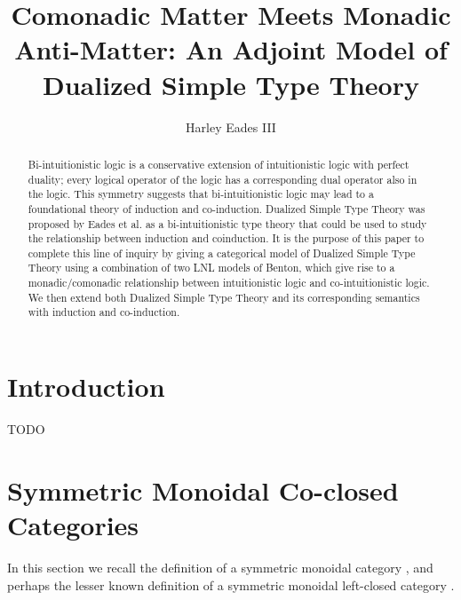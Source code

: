 \documentclass[letterpaper,USenglish]{lipics-v2016}
\date{}
\title{Comonadic Matter Meets Monadic Anti-Matter: An Adjoint Model of Dualized Simple Type Theory}
\author{Harley Eades III}
\affil{Computer and Information Sciences, Augusta University,
  Augusta, GA, \texttt{heades@augusta.edu}}
\begin{document}
\maketitle 

\begin{abstract}
  Bi-intuitionistic logic is a conservative extension of
  intuitionistic logic with perfect duality; every logical operator of
  the logic has a corresponding dual operator also in the logic.  This
  symmetry suggests that bi-intuitionistic logic may lead to a
  foundational theory of induction and co-induction.  Dualized Simple
  Type Theory was proposed by Eades et al. as a bi-intuitionistic type
  theory that could be used to study the relationship between
  induction and coinduction.  It is the purpose of this paper to
  complete this line of inquiry by giving a categorical model of
  Dualized Simple Type Theory using a combination of two LNL models of
  Benton, which give rise to a monadic/comonadic relationship between
  intuitionistic logic and co-intuitionistic logic.  We then extend
  both Dualized Simple Type Theory and its corresponding semantics
  with induction and co-induction.
\end{abstract}

\section{Introduction}
\label{sec:introduction}
TODO \cite{?}

\section{Symmetric Monoidal Co-closed Categories}
\label{sec:symmetric_monoidal_co-closed_categories}

In this section we recall the definition of a symmetric monoidal
category \cite{?}, and perhaps the lesser known definition of a
symmetric monoidal left-closed category \cite{?}.  
\end{document}
